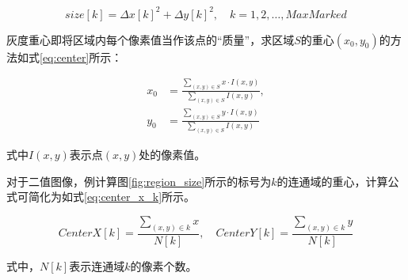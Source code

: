 \documentclass[12pt,hyperref,a4paper,UTF8]{ctexart}
\begin{document}
\begin{equation}\label{eq:size_k}
size[k] = \Delta x[k]^2 + \Delta y[k]^2, \quad k = 1, 2, \ldots, MaxMarked
\end{equation}

灰度重心即将区域内每个像素值当作该点的“质量”，求区域$S$的重心$(x_0, y_0)$的方法如式\eqref{eq:center}所示：

\begin{align}\label{eq:center}
x_0 &= \frac{\sum_{(x,y) \in S} x \cdot I(x,y)}{\sum_{(x,y) \in S} I(x,y)}, \\
y_0 &= \frac{\sum_{(x,y) \in S} y \cdot I(x,y)}{\sum_{(x,y) \in S} I(x,y)}
\end{align}

式中$I(x,y)$表示点$(x,y)$处的像素值。

对于二值图像，例计算图\ref{fig:region_size}所示的标号为$k$的连通域的重心，计算公式可简化为如式\eqref{eq:center_x_k}所示。

\begin{equation}\label{eq:center_x_k}
CenterX[k] = \frac{\sum_{(x,y) \in k} x}{N[k]}, \quad CenterY[k] = \frac{\sum_{(x,y) \in k} y}{N[k]}
\end{equation}

式中，$N[k]$表示连通域$k$的像素个数。
\end{document}
